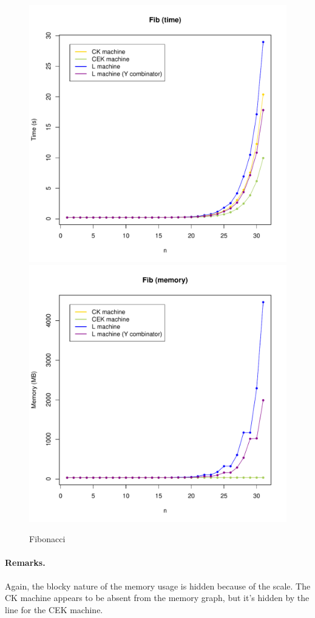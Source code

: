 \documentclass[a4paper]{article}
\begin{document}
\newpage
\begin{figure}[H]
\centering
\includegraphics[width=0.7\linewidth]{figs/fib-times.pdf}
\includegraphics[width=0.7\linewidth]{figs/fib-mem.pdf}
\caption{Fibonacci}\label{fig:fib-graphs}
\end{figure}

\paragraph{Remarks.}  Again, the blocky nature of the memory usage is hidden because
of the scale.  The CK machine appears to be absent from the memory
graph, but it's hidden by the line for the CEK machine.
\newpage
\end{document}
